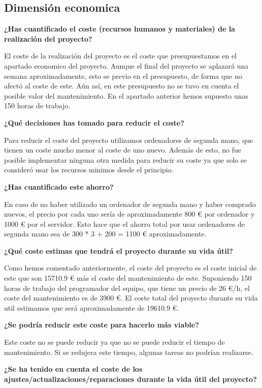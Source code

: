 \subsection{Dimensión economica}

\textbf{¿Has cuantificado el coste (recursos humanos y materiales) de la realización del proyecto?}

El coste de la realización del proyecto es el coste que presupuestamos en el apartado economico del proyecto. Aunque el final del proyecto se aplazará una semana aproximadamente, esto se previo en el presupuesto, de forma que no afectó al coste de este. Aún así, en este presupuesto no se tuvo en cuenta el posible valor del mantenimiento. En el apartado anterior hemos supuesto unas 150 horas de trabajo.

\textbf{¿Qué decisiones has tomado para reducir el coste?}

Para reducir el coste del proyecto utilizamos ordenadores de segunda mano, que tienen un coste mucho menor al coste de uno nuevo. Además de esto, no fue posible implementar ninguna otra medida para reducir su coste ya que solo se consideró usar los recursos minimos desde el principio.

\textbf{¿Has cuantificado este ahorro?}

En caso de no haber utilizado un ordenador de segunda mano y haber comprado nuevos, el precio por cada uno sería de aproximadamente 800 € por ordenador y 1000 € por el servidor. Esto hace que el ahorro total por usar ordenadores de segunda mano sea de 300 * 3 + 200 = 1100 € aproximadamente.

\textbf{¿Qué coste estimas que tendrá el proyecto durante su vida útil?}

Como hemos comentado anteriormente, el coste del proyecto es el coste inicial de este que son 15710.9 € más el coste del mantenimiento de este. Suponiendo 150 horas de trabajo del programador del equipo, que tiene un precio de 26 €/h, el coste del mantenimiento es de 3900 €. El coste total del proyecto durante su vida util estimamos que será aproximadamente de 19610.9 €.

\textbf{¿Se podría reducir este coste para hacerlo más viable?}

Este coste no se puede reducir ya que no se puede reducir el tiempo de mantenimiento. Si se redujera este tiempo, algunas tareas no podrían realizarse.

\textbf{¿Se ha tenido en cuenta el coste de los ajustes/actualizaciones/reparaciones durante la vida útil del proyecto?}


